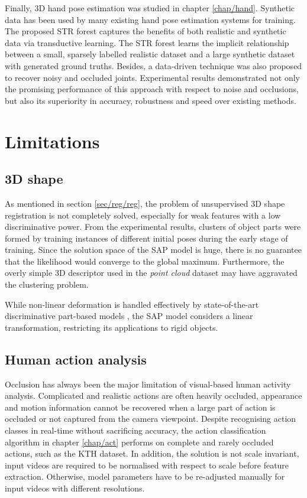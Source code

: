 Finally, 3D hand pose estimation was studied in chapter \ref{chap/hand}. Synthetic data has been used by many existing hand pose estimation systems for training. The proposed STR forest captures the benefits of both realistic and synthetic data via transductive learning. The STR forest learns the implicit relationship between a small, sparsely labelled realistic dataset and a large synthetic dataset with generated ground truths. Besides, a data-driven technique was also proposed to recover noisy and occluded joints. Experimental results demonstrated not only the promising performance of this approach with respect to noise and occlusions, but also its superiority in accuracy, robustness and speed over existing methods.

\section{Limitations}

\subsection{3D shape} 

As mentioned in section \ref{sec/reg/reg}, the problem of unsupervised 3D shape registration is not completely solved, especially for weak features with a low discriminative power. From the experimental results, clusters of object parts were formed by training instances of different initial poses during the early stage of training. Since the solution space of the SAP model is huge, there is no guarantee that the likelihood would converge to the global maximum. Furthermore, the overly simple 3D descriptor used in the \emph{point cloud} dataset may have aggravated the clustering problem.   

While non-linear deformation is handled effectively by state-of-the-art discriminative part-based models \cite{Felzenszwalb2010, Andriluka2009, Pishchulin2012}, the SAP model considers a linear transformation, restricting its applications to rigid objects. 

\subsection{Human action analysis} 

Occlusion has always been the major limitation of visual-based human activity analysis. Complicated and realistic actions are often heavily occluded, appearance and motion information cannot be recovered when a large part of action is occluded or not captured from the camera viewpoint. 
Despite recognising action classes in real-time without sacrificing accuracy, the action classification algorithm in chapter \ref{chap/act} performs on complete and rarely occluded actions, such as the KTH dataset. 
In addition, the solution is not scale invariant, input videos are required to be normalised with respect to scale before feature extraction. Otherwise, model parameters have to be re-adjusted manually for input videos with different resolutions.  

